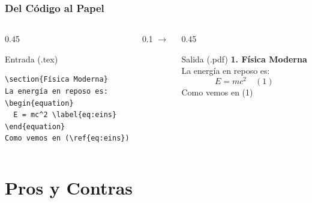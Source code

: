 \documentclass[12pt,aspectratio=169,ignorenonframetext]{ltxbeamer}
\begin{document}
\begin{frame}[fragile]
\frametitle{Del Código al Papel}
\begin{columns}
    \begin{column}{0.45\textwidth}
        \begin{block}{Entrada (.tex)}
\begin{verbatim}
\section{Física Moderna}
La energía en reposo es:
\begin{equation}
  E = mc^2 \label{eq:eins}
\end{equation}
Como vemos en (\ref{eq:eins})
\end{verbatim}
        \end{block}
    \end{column}

    \begin{column}{0.1\textwidth}
        \centering $\rightarrow$
    \end{column}

    \begin{column}{0.45\textwidth}
        \begin{exampleblock}{Salida (.pdf)}
            \lmr
            \textbf{\Large 1. Física Moderna}\\
            \vspace{0.2cm}
            La energía en reposo es:
            \begin{equation*}
                E = mc^2 \quad (1)
            \end{equation*}
            Como vemos en (1)
        \end{exampleblock}
    \end{column}
\end{columns}
\end{frame}



\section{Pros y Contras}
\end{document}
